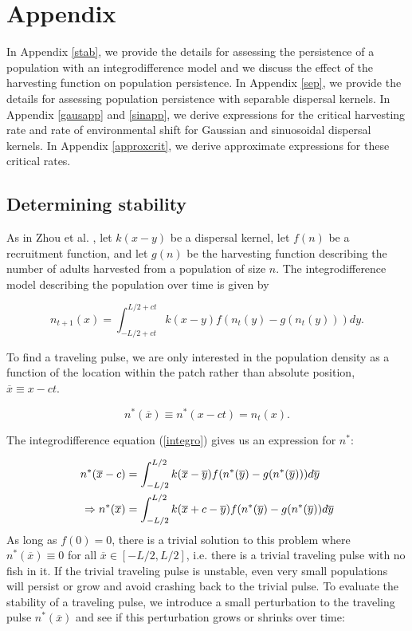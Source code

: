 \documentclass[12pt,english]{article}
\begin{document}
\appendix
\section{Appendix}
In Appendix \ref{stab}, we provide the details for assessing the persistence of a population with an integrodifference model and we discuss the effect of the harvesting function on population persistence.  In Appendix \ref{sep}, we provide the details for assessing population persistence with separable dispersal kernels.  In Appendix \ref{gausapp} and \ref{sinapp}, we derive expressions for the critical harvesting rate and rate of environmental shift for Gaussian and sinuosoidal dispersal kernels.  In Appendix \ref{approxcrit}, we derive approximate expressions for these critical rates.

\subsection{Determining stability \label{stab}}
As in Zhou et al. \citep{ZhouKot2011}, let $k(x-y)$ be a dispersal kernel, let $f(n)$ be a recruitment function, and let $g(n)$ be the harvesting function describing the number of adults harvested from a population of size $n$.  The integrodifference model describing the population over time is given by 

\begin{equation} n_{t+1}(x)=\int_{-L/2+ct}^{L/2+ct}k(x-y)f(n_t(y)-g(n_t(y)))dy. \label{integro} \end{equation}

To find a traveling pulse, we are only interested in the population density as a function of the location within the patch rather than absolute position, $\overline{x}\equiv x-ct$.

\begin{equation*}
n^*(\overline{x})\equiv n^*(x-ct)=n_t(x).   \label{trav} 
\end{equation*}

The integrodifference equation (\ref{integro}) gives us an expression for $n^*$:

\begin{align}
n^*(\overline{x}-c)&=\int_{-L/2}^{L/2}k(\overline{x}-\overline{y})f(n^*(\overline{y})-g(n^*(\overline{y})))d\overline y \notag
\\ \Rightarrow n^*(\overline{x})&=\int_{-L/2}^{L/2}k(\overline{x}+c-\overline{y})f(n^*(\overline{y})-g(n^*(\overline{y}))d\overline y  \label{pulse}
\end{align}
As long as $f(0)=0$, there is a trivial solution to this problem where $n^*(\overline{x})\equiv 0$ for all $\overline{x}\in[-L/2,L/2]$, i.e. there is a trivial traveling pulse with no fish in it.  If the trivial traveling pulse is unstable, even very small populations will persist or grow and avoid crashing back to the trivial pulse.  To evaluate the stability of a traveling pulse, we introduce a small perturbation to the traveling pulse $n^*(\overline{x})$ and see if this perturbation grows or shrinks over time:
\end{document}
